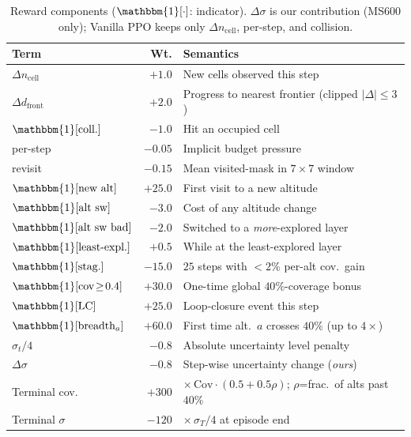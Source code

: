 \documentclass[conference]{IEEEtran}
\begin{document}
\begin{table}[t]
\caption{Reward components ($\mathbbm{1}[\cdot]$: indicator). $\Delta\sigma$ is our contribution (MS600 only); Vanilla PPO keeps only $\Delta n_{\text{cell}}$, per-step, and collision.}
\label{tab:reward}
\centering
\footnotesize
\setlength{\tabcolsep}{3pt}
\begin{tabular}{@{}l r p{4.6cm}@{}}
\toprule
Term & Wt. & Semantics \\
\midrule
$\Delta n_{\text{cell}}$ & $+1.0$ & New cells observed this step \\
$\Delta d_{\text{front}}$ & $+2.0$ & Progress to nearest frontier (clipped $|\Delta|\!\leq\!3$) \\
$\mathbbm{1}[\text{coll.}]$ & $-1.0$ & Hit an occupied cell \\
per-step & $-0.05$ & Implicit budget pressure \\
revisit & $-0.15$ & Mean visited-mask in $7{\times}7$ window \\
$\mathbbm{1}[\text{new alt}]$ & $+25.0$ & First visit to a new altitude \\
$\mathbbm{1}[\text{alt sw}]$ & $-3.0$ & Cost of any altitude change \\
$\mathbbm{1}[\text{alt sw bad}]$ & $-2.0$ & Switched to a \emph{more}-explored layer \\
$\mathbbm{1}[\text{least-expl.}]$ & $+0.5$ & While at the least-explored layer \\
$\mathbbm{1}[\text{stag.}]$ & $-15.0$ & $25$ steps with $<\!2\%$ per-alt cov.\ gain \\
$\mathbbm{1}[\text{cov}\!\geq\!0.4]$ & $+30.0$ & One-time global $40\%$-coverage bonus \\
$\mathbbm{1}[\text{LC}]$ & $+25.0$ & Loop-closure event this step \\
$\mathbbm{1}[\text{breadth}_a]$ & $+60.0$ & First time alt.\ $a$ crosses $40\%$ (up to $4\!\times$) \\
$\sigma_t/4$ & $-0.8$ & Absolute uncertainty level penalty \\
$\Delta\sigma$ & $-0.8$ & Step-wise uncertainty change (\emph{ours}) \\
\midrule
Terminal cov.\ & $+300$ & $\times\,\mathrm{Cov}\!\cdot\!(0.5+0.5\rho)$; $\rho$=frac.\ of alts past $40\%$ \\
Terminal $\sigma$ & $-120$ & $\times\,\sigma_T/4$ at episode end \\
\bottomrule
\end{tabular}
\end{table}
\end{document}
